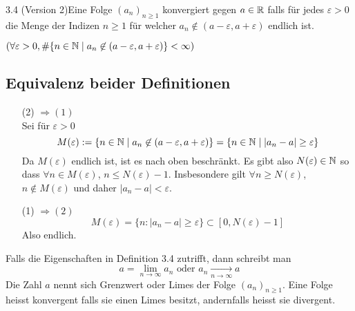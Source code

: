 \begin{definition}{3.4 (Version 2)}Eine Folge $(a_n)_{n\geq 1}$ konvergiert gegen $a\in\mathbb{R}$ falls für jedes $\varepsilon>0$ die Menge der Indizen $n\geq 1$ für welcher $a_n\not\in (a-\varepsilon,a+\varepsilon)$ endlich ist.\\

\centerline{$\left( \forall\varepsilon>0, \#\{ n\in\mathbb{N}\mid a_n\not\in (a-\varepsilon,a+\varepsilon)\} <\infty\right)$}
\end{definition}

\subsection*{Equivalenz beider Definitionen}
\begin{enumerate}

\item[(2)] $\Rightarrow(1)$ \\Sei für  $\varepsilon>0$ \[M(\varepsilon):=\{ n\in\mathbb{N}\mid a_n\not\in (a-\varepsilon,a+\varepsilon)\}=\{n\in\mathbb{N}\mid \left| a_n-a \right|\geq \varepsilon\}\]
Da $M(\varepsilon)$ endlich ist, ist es nach oben beschränkt. Es  gibt also $N(\varepsilon)\in\mathbb{N}$ so dass $\forall n\in M(\varepsilon)$, $n\leq N(\varepsilon)-1$. Insbesondere gilt $\forall n\geq N(\varepsilon)$, $n\not\in M(\varepsilon)$ und daher $\left| a_n-a\right|<\varepsilon$.
\item[(1)] $\Rightarrow(2)$ \[M(\varepsilon)=\{ n:\left| a_n-a\right| \geq \varepsilon\} \subset \left[ 0,N(\varepsilon)-1 \right]\] Also endlich.
\end{enumerate}

\noindent Falls die Eigenschaften in Definition 3.4 zutrifft, dann schreibt man\[a = \mathop {\lim }\limits_{n \to \infty } {a_n}{\text{ oder }}{a_n}\mathop  \to \limits_{n \to \infty } a\] Die Zahl $a$ nennt sich Grenzwert oder Limes der Folge $(a_n)_{n\geq 1}$. Eine Folge heisst konvergent falls sie einen Limes besitzt, andernfalls heisst sie divergent.

